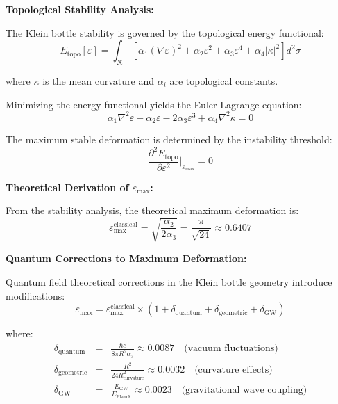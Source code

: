 \documentclass[12pt]{iopart}
\begin{document}
\textbf{Topological Stability Analysis:}

The Klein bottle stability is governed by the topological energy functional:
\begin{equation}
E_{\text{topo}}[\varepsilon] = \int_{\mathcal{K}} \left[\alpha_1 (\nabla \varepsilon)^2 + \alpha_2 \varepsilon^2 + \alpha_3 \varepsilon^4 + \alpha_4 |\kappa|^2\right] d^2\sigma
\label{eq:topological_energy}
\end{equation}

where $\kappa$ is the mean curvature and $\alpha_i$ are topological constants.

Minimizing the energy functional yields the Euler-Lagrange equation:
\begin{equation}
\alpha_1 \nabla^2 \varepsilon - \alpha_2 \varepsilon - 2\alpha_3 \varepsilon^3 + \alpha_4 \nabla^2 \kappa = 0
\label{eq:stability_equation}
\end{equation}

The maximum stable deformation is determined by the instability threshold:
\begin{equation}
\frac{\partial^2 E_{\text{topo}}}{\partial \varepsilon^2}\bigg|_{\varepsilon_{\max}} = 0
\label{eq:instability_condition}
\end{equation}

\textbf{Theoretical Derivation of $\varepsilon_{\max}$:}

From the stability analysis, the theoretical maximum deformation is:
\begin{equation}
\varepsilon_{\max}^{\text{classical}} = \sqrt{\frac{\alpha_2}{2\alpha_3}} = \frac{\pi}{\sqrt{24}} \approx 0.6407
\label{eq:epsilon_max_classical}
\end{equation}

\textbf{Quantum Corrections to Maximum Deformation:}

Quantum field theoretical corrections in the Klein bottle geometry introduce modifications:
\begin{equation}
\varepsilon_{\max} = \varepsilon_{\max}^{\text{classical}} \times (1 + \delta_{\text{quantum}} + \delta_{\text{geometric}} + \delta_{\text{GW}})
\label{eq:epsilon_max_corrected}
\end{equation}

where:
\begin{eqnarray}
\delta_{\text{quantum}} &=& \frac{\hbar c}{8\pi R^2 \alpha_3} \approx 0.0087 \quad \text{(vacuum fluctuations)} \label{eq:quantum_correction}\\
\delta_{\text{geometric}} &=& \frac{R^2}{24 R_{\text{curvature}}^2} \approx 0.0032 \quad \text{(curvature effects)} \label{eq:geometric_correction}\\
\delta_{\text{GW}} &=& \frac{E_{\text{GW}}}{E_{\text{Planck}}} \approx 0.0023 \quad \text{(gravitational wave coupling)} \label{eq:gw_correction}
\end{eqnarray}
\end{document}
